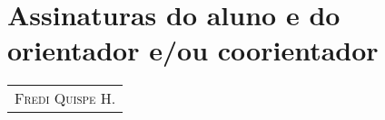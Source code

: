 \documentclass[a4paper, 11pt]{article}
\begin{document}
\section{Assinaturas do aluno e do orientador e/ou coorientador}



 
\vfill \hfill
\begin{tabular}{c}

\\ \hline
\textsc{Fredi Quispe H.}
\end{tabular}
\end{document}
